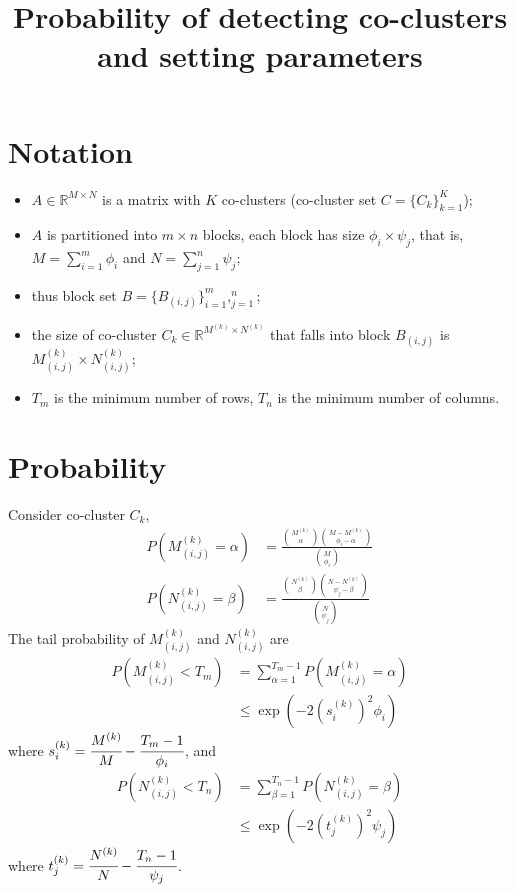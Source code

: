 \documentclass[12pt]{article}
\title{Probability of detecting co-clusters and setting parameters}
\author{}
\date{}
\begin{document}
\maketitle
\section{Notation}
\begin{itemize}
    \item $A \in \mathbb{R}^{M \times N}$ is a matrix with $K$ co-clusters (co-cluster set $C = \{C_k\}_{k=1}^K$);
    \item $A$ is partitioned into $m \times n$ blocks, each block has size $\phi_i \times \psi_j$, that is, $M=\sum_{i=1}^m \phi_i$ and $N=\sum_{j=1}^n \psi_j$;
    \item thus block set $B = \{B_{(i,j)}\}_{i=1}^m,_{j=1}^n$;
    \item the size of co-cluster $C_k \in \mathbb{R}^{M^{(k)} \times N^{(k)}}$ that falls into block $B_{(i,j)}$ is $M_{(i,j)}^{(k)} \times N_{(i,j)}^{(k)}$;
    \item $T_m$ is the minimum number of rows, $T_n$ is the minimum number of columns.
\end{itemize}

\section{Probability}
Consider co-cluster $C_k$,
\begin{align*}
    P(M_{(i,j)}^{(k)} = \alpha) & = \frac{\binom{M^{(k)}}{\alpha} \binom{M-M^{(k)}}{\phi_i-\alpha}}{\binom{M}{\phi_i}} \\
    P(N_{(i,j)}^{(k)} = \beta)  & = \frac{\binom{N^{(k)}}{\beta} \binom{N-N^{(k)}}{\psi_j-\beta}}{\binom{N}{\psi_j}}
\end{align*}
The tail probability of $M_{(i,j)}^{(k)}$ and $N_{(i,j)}^{(k)}$ are
\begin{align*}
    P(M_{(i,j)}^{(k)} < T_m) & = \sum_{\alpha=1}^{T_m-1} P(M_{(i,j)}^{(k)} = \alpha) \\
                             & \le \exp(-2 (s_i^{(k)})^2 \phi_i)
\end{align*}
where $s_i^{(k)} = \cfrac{M^{(k)}}{M}-\cfrac{T_m-1}{\phi_i}$, and
\begin{align*}
    P(N_{(i,j)}^{(k)} < T_n) & = \sum_{\beta=1}^{T_n-1} P(N_{(i,j)}^{(k)} = \beta) \\
                             & \le \exp (-2 (t_j^{(k)})^2 \psi_j)
\end{align*}
where $t_j^{(k)} = \cfrac{N^{(k)}}{N}-\cfrac{T_n-1}{\psi_j}$.
\end{document}
